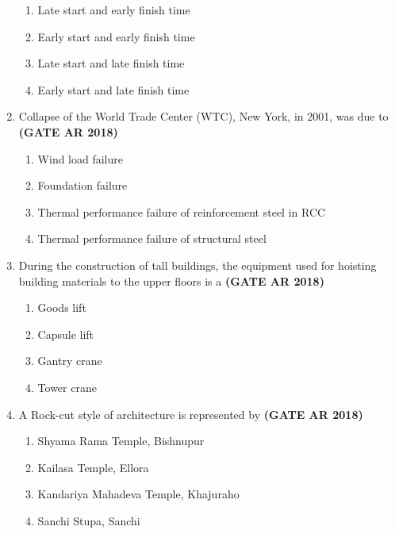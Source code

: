\documentclass[journal,15pt,onecolumn]{IEEEtran}
\theoremstyle{remark}
\begin{document}
\begin{enumerate}
\vspace{0.5em}

\begin{enumerate}

\item  Late start and early finish time 
\item  Early start and early finish time 
\item  Late start and late finish time 
\item  Early start and late finish time
\end{enumerate}


\item 
Collapse of the World Trade Center (WTC), New York, in 2001, was due to\hfill \textbf{ (GATE AR 2018)}

\vspace{0.5em}

\begin{enumerate}
\item  Wind load failure 
\item  Foundation failure 
\item  Thermal performance failure of reinforcement steel in RCC
\item Thermal performance failure of structural steel
\end{enumerate}

\item 
During the construction of tall buildings, the equipment used for hoisting building materials to the upper floors is a\hfill \textbf{ (GATE AR 2018)}

\vspace{0.5em}

\begin{enumerate}
\item Goods lift
\item Capsule lift 
\item Gantry crane
\item  Tower crane
\end{enumerate}

\item 
A Rock-cut style of architecture is represented by\hfill \textbf{ (GATE AR 2018)}

\vspace{0.5em}
\begin{enumerate}
\item  Shyama Rama Temple, Bishnupur 
\item Kailasa Temple, Ellora 
\item Kandariya Mahadeva Temple, Khajuraho 
\item  Sanchi Stupa, Sanchi
\end{enumerate}


\end{enumerate}
\end{document}
